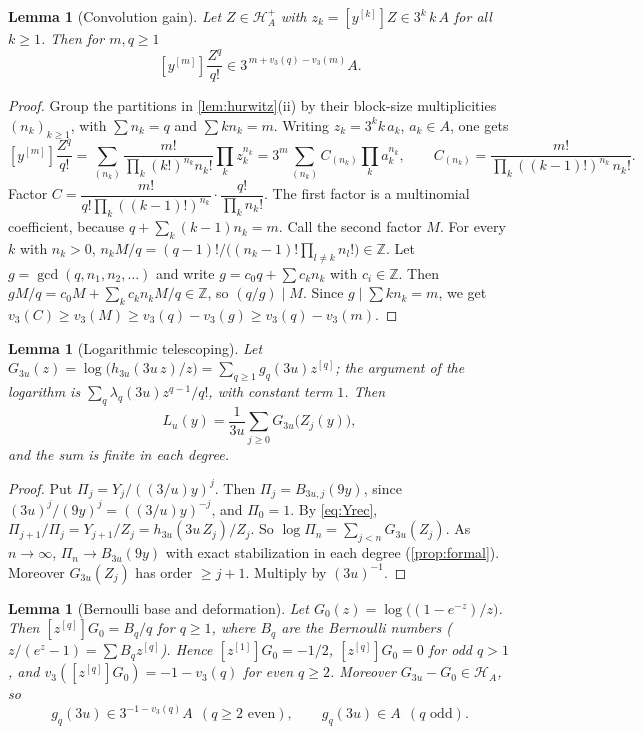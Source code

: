 \documentclass[11pt,reqno]{amsart}
\newtheorem{lemma}[theorem]{Lemma}
\theoremstyle{definition}
\theoremstyle{remark}
\theoremstyle{plain}
\newcommand{\Z}{\mathbb Z}
\newcommand{\Hur}{\mathcal H}
\newcommand{\hc}[1]{[z^{[#1]}]}
\newcommand{\hy}[1]{[y^{[#1]}]}
\begin{document}
\begin{lemma}[Convolution gain]\label{lem:convolution}
Let $Z\in\Hur_A^+$ with $z_k=\hy kZ\in3^k\,k\,A$ for all $k\ge1$. Then for $m,q\ge1$
\[
\hy m\frac{Z^q}{q!}\in3^{\,m+v_3(q)-v_3(m)}A .
\]
\end{lemma}

\begin{proof}
Group the partitions in \cref{lem:hurwitz}(ii) by their block-size multiplicities $(n_k)_{k\ge1}$, with $\sum n_k=q$ and $\sum kn_k=m$. Writing $z_k=3^kk\,a_k$, $a_k\in A$, one gets
\[
\hy m\frac{Z^q}{q!}=\sum_{(n_k)}\frac{m!}{\prod_k(k!)^{n_k}n_k!}\prod_kz_k^{n_k}
=3^m\sum_{(n_k)}C_{(n_k)}\prod_ka_k^{n_k},\qquad C_{(n_k)}=\frac{m!}{\prod_k((k-1)!)^{n_k}\,n_k!}.
\]
Factor $C=\dfrac{m!}{q!\prod_k((k-1)!)^{n_k}}\cdot\dfrac{q!}{\prod_kn_k!}$. The first factor is a multinomial coefficient, because $q+\sum_k(k-1)n_k=m$. Call the second factor $M$. For every $k$ with $n_k>0$, $n_kM/q=(q-1)!/\bigl((n_k-1)!\prod_{l\ne k}n_l!\bigr)\in\Z$. Let $g=\gcd(q,n_1,n_2,\dots)$ and write $g=c_0q+\sum c_kn_k$ with $c_i\in\Z$. Then $gM/q=c_0M+\sum_kc_kn_kM/q\in\Z$, so $(q/g)\mid M$. Since $g\mid\sum kn_k=m$, we get $v_3(C)\ge v_3(M)\ge v_3(q)-v_3(g)\ge v_3(q)-v_3(m)$.
\end{proof}

\begin{lemma}[Logarithmic telescoping]\label{lem:telescope}
Let $G_{3u}(z)=\log\bigl(h_{3u}(3u\,z)/z\bigr)=\sum_{q\ge1}g_q(3u)z^{[q]}$; the argument of the logarithm is $\sum_q\lambda_q(3u)z^{q-1}/q!$, with constant term $1$. Then
\[
L_u(y)=\frac1{3u}\sum_{j\ge0}G_{3u}\bigl(Z_j(y)\bigr),
\]
and the sum is finite in each degree.
\end{lemma}

\begin{proof}
Put $\Pi_j=Y_j/((3/u)y)^j$. Then $\Pi_j=B_{3u,j}(9y)$, since $(3u)^j/(9y)^j=((3/u)y)^{-j}$, and $\Pi_0=1$. By \eqref{eq:Yrec}, $\Pi_{j+1}/\Pi_j=Y_{j+1}/Z_j=h_{3u}(3u\,Z_j)/Z_j$. So $\log\Pi_n=\sum_{j<n}G_{3u}(Z_j)$. As $n\to\infty$, $\Pi_n\to B_{3u}(9y)$ with exact stabilization in each degree (\cref{prop:formal}). Moreover $G_{3u}(Z_j)$ has order $\ge j+1$. Multiply by $(3u)^{-1}$.
\end{proof}

\begin{lemma}[Bernoulli base and deformation]\label{lem:bernoulli}
Let $G_0(z)=\log\bigl((1-e^{-z})/z\bigr)$. Then $\hc qG_0=B_q/q$ for $q\ge1$, where $B_q$ are the Bernoulli numbers ($z/(e^z-1)=\sum B_qz^{[q]}$). Hence $\hc1G_0=-1/2$, $\hc qG_0=0$ for odd $q>1$, and $v_3(\hc qG_0)=-1-v_3(q)$ for even $q\ge2$. Moreover $G_{3u}-G_0\in\Hur_A$, so
\[
g_q(3u)\in3^{-1-v_3(q)}A\ \ (q\ge2\text{ even}),\qquad g_q(3u)\in A\ \ (q\text{ odd}).
\]
\end{lemma}
\end{document}

